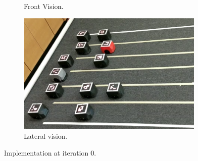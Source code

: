 \begin{appendix}
\begin{figure}[H]
\begin{subfigure}[b]{0.4\textwidth}
    \caption{Front Vision.}
    \label{fig:second}
\end{subfigure}
\hfill
\begin{subfigure}[b]{0.50\textwidth}
    \includegraphics[width=\textwidth]{Anexos/no_restricted/no_res_it0_cam2.png}
    \caption{Lateral vision.}
    \label{fig:third}
\end{subfigure}
\caption{Implementation at iteration 0.}
\label{fig:figures}
\end{figure}






\end{appendix}

